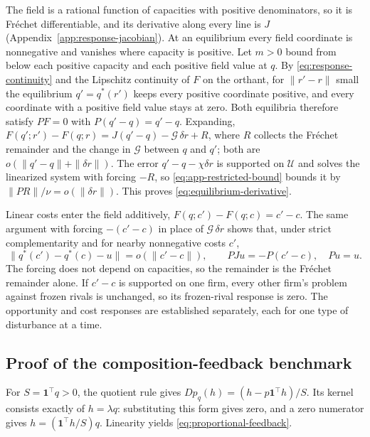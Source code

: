 The field is a rational function of capacities with positive
denominators, so it is
Fréchet differentiable, and its derivative along every line is $J$
(Appendix~\ref{app:response-jacobian}).
At an equilibrium every field coordinate is nonnegative and vanishes
where capacity
is positive.
Let $m>0$ bound from below each positive capacity and
each positive field value at $q$.
By \eqref{eq:response-continuity} and the Lipschitz continuity of $F$
on the orthant,
for $\|r'-r\|$ small the equilibrium $q'=q^*(r')$ keeps every
positive coordinate
positive, and every coordinate with a positive field value stays at zero.
Both equilibria therefore satisfy $PF=0$ with $P(q'-q)=q'-q$.
Expanding, $F(q';r')-F(q;r)=J(q'-q)-\mathcal G\,\delta r+R$, where
$R$ collects the
Fréchet remainder and the change in $\mathcal G$ between $q$ and $q'$; both are
$o(\|q'-q\|+\|\delta r\|)$.
The error $q'-q-\chi\delta r$ is supported on $\mathcal U$ and solves
the linearized
system with forcing $-R$, so \eqref{eq:app-restricted-bound} bounds it by
$\|PR\|/\nu=o(\|\delta r\|)$.
This proves \eqref{eq:equilibrium-derivative}.

Linear costs enter the field additively, $F(q;c')-F(q;c)=c'-c$.
The same argument with forcing $-(c'-c)$ in place of $\mathcal
G\,\delta r$ shows that,
under strict complementarity and for nearby nonnegative costs $c'$,
\begin{equation}\label{eq:cost-response}
  \|q^*(c')-q^*(c)-u\|=o(\|c'-c\|),\qquad PJu=-P(c'-c),\quad Pu=u.
\end{equation}
The forcing does not depend on capacities, so the remainder is the
Fréchet remainder
alone.
If $c'-c$ is supported on one firm, every other firm's problem
against frozen rivals
is unchanged, so its frozen-rival response is zero.
The opportunity and cost responses are established separately, each for one
type of disturbance at a time.

\subsection{Proof of the composition-feedback
benchmark}\label{app:composition-feedback}

For $S=\mathbf1^\top q>0$, the quotient rule gives
$Dp_q(h)=(h-p\mathbf1^\top h)/S$.
Its kernel consists exactly of $h=\lambda q$: substituting this form gives
zero, and a zero numerator gives $h=(\mathbf1^\top h/S)q$.
Linearity yields \eqref{eq:proportional-feedback}.

